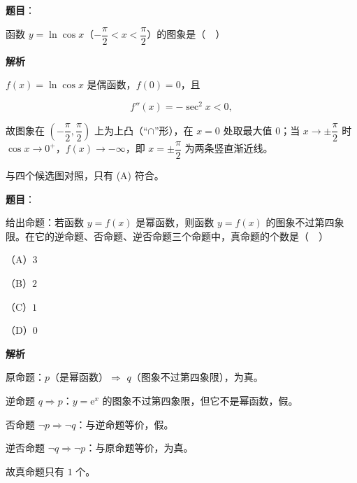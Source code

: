 \begin{answer}

\textbf{题目}：

函数 $y=\ln\cos x$（$-\dfrac{\pi}{2}<x<\dfrac{\pi}{2}$）的图象是（　）
\nopagebreak[4]
\begin{center}\end{center}
\nopagebreak[4]
\textbf{解析}

$f(x)=\ln\cos x$ 是偶函数，$f(0)=0$，且

\nopagebreak[4]
\[f''(x)=-\sec^2x<0,\]

故图象在 $\left(-\dfrac{\pi}{2},\dfrac{\pi}{2}\right)$ 上为上凸（“$\cap$”形），在 $x=0$ 处取最大值 $0$；当 $x\to\pm\dfrac{\pi}{2}$ 时 $\cos x\to0^+$，$f(x)\to-\infty$，即 $x=\pm\dfrac{\pi}{2}$ 为两条竖直渐近线。

与四个候选图对照，只有 (A) 符合。


\end{answer}
\begin{answer}

\textbf{题目}：

给出命题：若函数 $y=f(x)$ 是幂函数，则函数 $y=f(x)$ 的图象不过第四象限。在它的逆命题、否命题、逆否命题三个命题中，真命题的个数是（　）

（A）$3$

（B）$2$

（C）$1$

（D）$0$

\textbf{解析}

原命题：$p$（是幂函数）$\Rightarrow$ $q$（图象不过第四象限），为真。

逆命题 $q\Rightarrow p$：$y=\mathrm e^x$ 的图象不过第四象限，但它不是幂函数，假。

否命题 $\neg p\Rightarrow\neg q$：与逆命题等价，假。

逆否命题 $\neg q\Rightarrow\neg p$：与原命题等价，为真。

故真命题只有 $1$ 个。


\end{answer}
